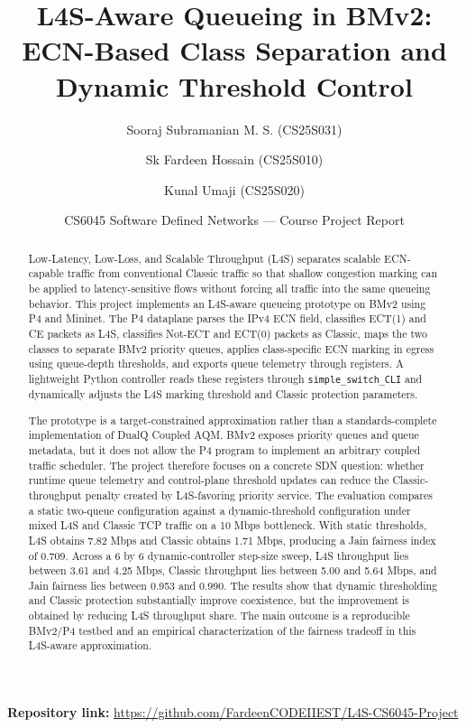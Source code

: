 \documentclass[10pt]{article}
\title{\textbf{L4S-Aware Queueing in BMv2: ECN-Based Class Separation and Dynamic Threshold Control}}
\author{
Sooraj Subramanian M. S. (CS25S031) \and
Sk Fardeen Hossain (CS25S010) \and
Kunal Umaji (CS25S020)
}
\date{CS6045 Software Defined Networks --- Course Project Report}
\begin{document}
\maketitle

\noindent\textbf{Repository link:} \url{https://github.com/FardeenCODEIIEST/L4S-CS6045-Project}

\begin{abstract}
Low-Latency, Low-Loss, and Scalable Throughput (L4S) separates scalable ECN-capable traffic from conventional Classic traffic so that shallow congestion marking can be applied to latency-sensitive flows without forcing all traffic into the same queueing behavior. This project implements an L4S-aware queueing prototype on BMv2 using P4 and Mininet. The P4 dataplane parses the IPv4 ECN field, classifies ECT(1) and CE packets as L4S, classifies Not-ECT and ECT(0) packets as Classic, maps the two classes to separate BMv2 priority queues, applies class-specific ECN marking in egress using queue-depth thresholds, and exports queue telemetry through registers. A lightweight Python controller reads these registers through \texttt{simple\_switch\_CLI} and dynamically adjusts the L4S marking threshold and Classic protection parameters.

The prototype is a target-constrained approximation rather than a standards-complete implementation of DualQ Coupled AQM. BMv2 exposes priority queues and queue metadata, but it does not allow the P4 program to implement an arbitrary coupled traffic scheduler. The project therefore focuses on a concrete SDN question: whether runtime queue telemetry and control-plane threshold updates can reduce the Classic-throughput penalty created by L4S-favoring priority service. The evaluation compares a static two-queue configuration against a dynamic-threshold configuration under mixed L4S and Classic TCP traffic on a 10 Mbps bottleneck. With static thresholds, L4S obtains 7.82 Mbps and Classic obtains 1.71 Mbps, producing a Jain fairness index of 0.709. Across a 6 by 6 dynamic-controller step-size sweep, L4S throughput lies between 3.61 and 4.25 Mbps, Classic throughput lies between 5.00 and 5.64 Mbps, and Jain fairness lies between 0.953 and 0.990. The results show that dynamic thresholding and Classic protection substantially improve coexistence, but the improvement is obtained by reducing L4S throughput share. The main outcome is a reproducible BMv2/P4 testbed and an empirical characterization of the fairness tradeoff in this L4S-aware approximation.
\end{abstract}
\end{document}
